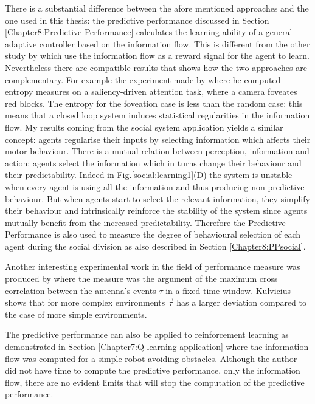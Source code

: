 There is a substantial difference between the afore mentioned approaches and the
one used in this thesis:
the predictive performance discussed in Section \ref{Chapter8:Predictive Performance}
calculates the learning ability of a general adaptive controller
 based on the information flow.
This is different from the other study by \citet{organizationInfo,LungarellaInformationStructure,AyClosedLoop} 
which use the information flow as a reward signal for the agent to learn.
Nevertheless there are compatible results that shows how the
two approaches are complementary.
For example the experiment made by \citet{LungarellaInformationStructure}
where he computed entropy measures on a saliency-driven attention
task, where a camera foveates red blocks. The entropy for the
foveation case is less than the random case:
this means that a closed loop system induces statistical regularities
in the information flow.
My results coming from the social system application yields
a similar concept: agents regularise their inputs
by selecting information which affects their motor behaviour.
There is a mutual relation between perception, information and action:
agents select the information which in turns change their
behaviour and their predictability.
Indeed in Fig.\ref{social:learning1}(D) the system is unstable
when every agent is using all the information and thus producing
non predictive behaviour. But when agents start to select the
relevant information, they simplify their behaviour and intrinsically reinforce
the stability of the system since agents mutually benefit from the increased predictability.
Therefore the Predictive Performance is also used to measure the degree of behavioural
selection of each agent during the social division as also described in Section \ref{Chapter8:PPsocial}.

Another interesting experimental work in the field of performance measure was produced 
by \citet{Kulvicius2009:analysisdifferential} where the measure was the argument of the maximum 
cross correlation between the antenna's events $\bar{\tau}$ in a fixed time window.
Kulvicius shows that for more complex environments $\vec{\tau}$ has a larger
deviation compared to the case of more simple environments.

The predictive performance can also be applied to reinforcement learning \citep{TD}
as demonstrated in Section \ref{Chapter7:Q learning application} where
the information flow was computed for a simple robot avoiding obstacles.
Although the author did not have time to compute the predictive performance, 
only the information flow, there are no evident limits that will stop
the computation of the predictive performance.

